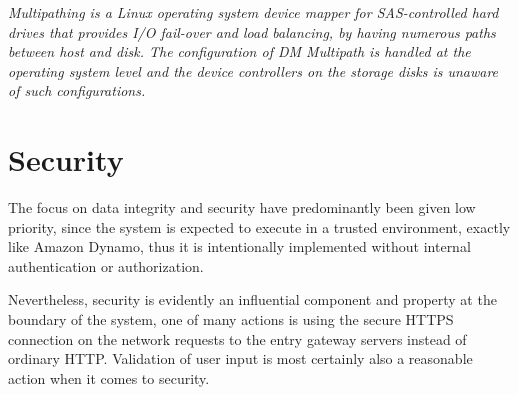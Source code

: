 \begin{definition}[DM Multipath] \label{def:multipath}
\textit{Multipathing is a Linux operating system device mapper for SAS-controlled hard drives that provides I/O fail-over and load balancing, by having numerous paths between host and disk. The configuration of DM Multipath is handled at the operating system level and the device controllers on the storage disks is unaware of such configurations.}
\end{definition}

\section{Security} \label{sec:security}
The focus on data integrity and security have predominantly been given low priority, since the system is expected to execute in a trusted environment, exactly like Amazon Dynamo, thus it is intentionally implemented without internal authentication or authorization.
\newline

Nevertheless, security is evidently an influential component and property at the boundary of the system, one of many actions is \eg using the secure HTTPS connection on the network requests to the entry gateway servers instead of ordinary HTTP. Validation of user input is most certainly also a reasonable action when it comes to security.
